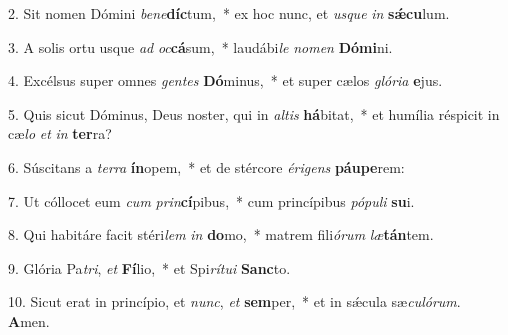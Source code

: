 2. Sit nomen Dómini \textit{be}\textit{ne}\textbf{díc}tum,~*  ex hoc nunc, et \textit{us}\textit{que} \textit{in} \textbf{sǽ}\textbf{cu}lum.\

3. A solis ortu usque \textit{ad} \textit{oc}\textbf{cá}sum,~*  laudábi\textit{le} \textit{no}\textit{men} \textbf{Dó}\textbf{mi}ni.\

4. Excélsus super omnes \textit{gen}\textit{tes} \textbf{Dó}minus,~*  et super cælos \textit{gló}\textit{ri}\textit{a} \textbf{e}jus.\

5. Quis sicut Dóminus, Deus noster, qui in \textit{al}\textit{tis} \textbf{há}bitat,~*  et humília réspicit in cæ\textit{lo} \textit{et} \textit{in} \textbf{ter}ra?\

6. Súscitans a \textit{ter}\textit{ra} \textbf{ín}opem,~*  et de stércore \textit{é}\textit{ri}\textit{gens} \textbf{páu}\textbf{pe}rem:\

7. Ut cóllocet eum \textit{cum} \textit{prin}\textbf{cí}pibus,~*  cum princípibus \textit{pó}\textit{pu}\textit{li} \textbf{su}i.\

8. Qui habitáre facit stéri\textit{lem} \textit{in} \textbf{do}mo,~*  matrem fili\textit{ó}\textit{rum} \textit{læ}\textbf{tán}tem.\

9. Glória Pa\textit{tri}, \textit{et} \textbf{Fí}lio,~*  et Spi\textit{rí}\textit{tu}\textit{i} \textbf{Sanc}to.\

10. Sicut erat in princípio, et \textit{nunc}, \textit{et} \textbf{sem}per,~*  et in sǽcula sæ\textit{cu}\textit{ló}\textit{rum}. \textbf{A}men.\

